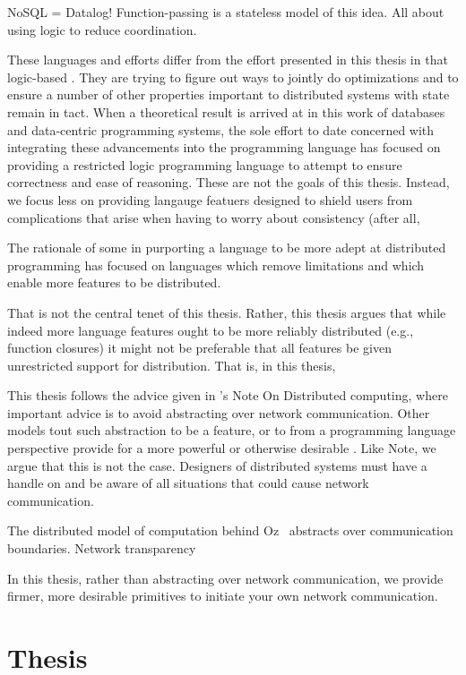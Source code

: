 NoSQL = Datalog! Function-passing is a stateless model of this idea. All about
using logic to reduce coordination.

These languages and efforts differ from the effort presented in this thesis in
that logic-based . They are trying to figure out ways to jointly do
optimizations and to ensure a number of other properties important to
distributed systems with state remain in tact. When a theoretical result is
arrived at in this work of databases and data-centric programming systems, the
sole effort to date concerned with integrating these advancements into the
programming language has focused on providing a restricted logic programming
language to attempt to ensure correctness and ease of reasoning. These are not
the goals of this thesis. Instead, we focus less on providing langauge featuers designed to shield users from complications that arise when having to worry about consistency (after all,


The rationale of some in purporting a language to be more adept at distributed
programming has focused on languages which remove limitations and which enable
more features to be distributed.

That is not the central tenet of this thesis. Rather, this thesis argues that
while indeed more language features ought to be more reliably distributed (e.g.,
function closures) it might not be preferable that all features be given
unrestricted support for distribution. That is, in this thesis,

This thesis follows the advice given in 's Note On Distributed computing, where
important advice is to avoid abstracting over network communication. Other
models tout such abstraction to be a feature, or to from a programming language
perspective provide for a more powerful or otherwise desirable . Like Note, we
argue that this is not the case. Designers of distributed systems must have a
handle on and be aware of all situations that could cause network communication.

The distributed model of computation behind Oz~\cite{DistributedOz} abstracts
over communication boundaries. Network transparency
~\cite{ConceptsTechniquesModelsProgramming}

In this thesis, rather than abstracting over network communication, we provide
firmer, more desirable primitives to initiate your own network communication.


\section{Thesis}

